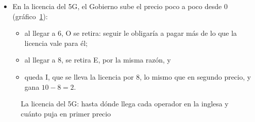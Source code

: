 \documentclass[11pt]{article}
\begin{document}
\begin{itemize}
  \begin{itemize}
  \item En la licencia del 5G, el Gobierno sube el precio poco a poco desde 0 (gráfico~\ref{fig:subasta-5g}):
    \begin{itemize}
    \item al llegar a 6, O se retira: seguir le obligaría a pagar más de lo que la licencia vale para él;
    \item al llegar a 8, se retira E, por la misma razón, y
    \item queda \textup{I}, que se lleva la licencia por 8, lo mismo que en segundo precio, y gana $10-8=2$.
    \end{itemize}
  \end{itemize}
\end{itemize}

\begin{figure}[H]
\centering
\caption{La licencia del 5G: hasta dónde llega cada operador en la inglesa y cuánto puja en primer precio}\label{fig:subasta-5g}
\end{figure}
\end{document}
